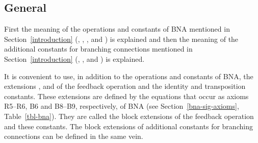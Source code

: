 \documentclass[fleqn]{llncs}
\begin{document}
\subsection{General}
\label{overview-general}
First the meaning of the operations and constants of BNA
mentioned in Section~\ref{introduction} (, , ,
 and ) is explained and then the meaning of the 
additional constants for branching connections mentioned in 
Section~\ref{introduction} (, ,  and 
) is explained.

It is convenient to use, in addition to the operations and constants of
BNA, the extensions ,  and  of the
feedback operation and the identity and transposition constants.
These extensions are defined by the equations that occur as axioms 
R5--R6, B6 and B8--B9, respectively, of BNA 
(see Section~\ref{bna-sig-axioms}, Table~\ref{tbl-bna}).
They are called the block extensions of the feedback operation and these
constants.
The block extensions of additional constants for branching connections
can be defined in the same vein.
\end{document}

